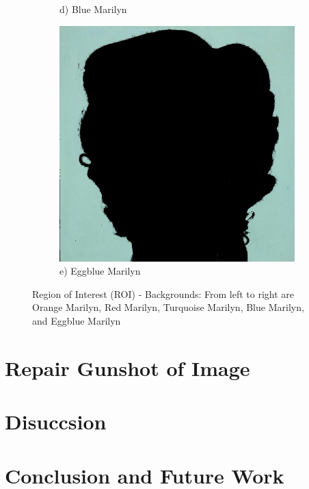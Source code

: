 \documentclass{article}
\begin{document}
\begin{figure}[htbp]
\begin{subfigure}[b]{0.19\textwidth}
        \caption*{d) Blue Marilyn}
    \end{subfigure}
    \hfill
    \begin{subfigure}[b]{0.19\textwidth}
        \includegraphics[width=\textwidth]{main_files/figure-latex/12_1_eggblue_marilyn_background_extraction.jpg}
        \caption*{e) Eggblue Marilyn}
    \end{subfigure}
    
    \caption{Region of Interest (ROI) - Backgrounds: From left to right are Orange Marilyn, Red Marilyn, Turquoise Marilyn, Blue Marilyn, and Eggblue Marilyn}
\end{figure}

\hypertarget{repair-gunshot-of-image}{%
\section{Repair Gunshot of Image}\label{repair-gunshot-of-image}}

\hypertarget{disuccsion}{%
\section{Disuccsion}\label{disuccsion}}

\hypertarget{conclusion-and-future-work}{%
\section*{Conclusion and Future Work}\label{conclusion-and-future-work}}
\end{document}
